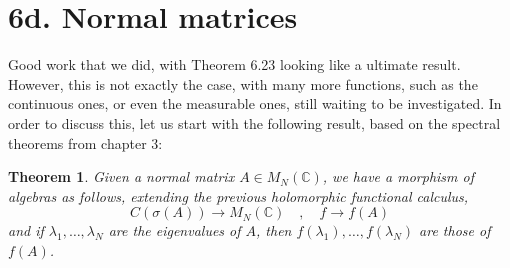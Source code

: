 \documentclass[12pt]{amsbook}
\newtheorem{theorem}{Theorem}[chapter]
\begin{document}
\section*{6d. Normal matrices}

Good work that we did, with Theorem 6.23 looking like a ultimate result. However, this is not exactly the case, with many more functions, such as the continuous ones, or even the measurable ones, still waiting to be investigated. In order to discuss this, let us start with the following result, based on the spectral theorems from chapter 3:

\begin{theorem}
Given a normal matrix $A\in M_N(\mathbb C)$, we have a morphism of algebras as follows, extending the previous holomorphic functional calculus,
$$C(\sigma(A))\to M_N(\mathbb C)\quad,\quad f\to f(A)$$
and if $\lambda_1,\ldots,\lambda_N$ are the eigenvalues of $A$, then $f(\lambda_1),\ldots,f(\lambda_N)$ are those of $f(A)$.
\end{theorem}
\end{document}
